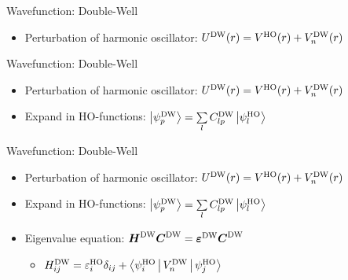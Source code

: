 \documentclass[10pt, t, xcolor=dvipsnames]{beamer}
\begin{document}
{{{{{\begin{frame}[fragile]{Wavefunction: Double-Well}
    \begin{itemize}
        \item Perturbation of harmonic oscillator: $U^{\text{DW}}(r) = V^{\text{HO}}(r) + V^{\text{DW}}_n(r)$
    \end{itemize}
\end{frame}

\begin{frame}[fragile]{Wavefunction: Double-Well}
    \begin{itemize}
        \item Perturbation of harmonic oscillator: $U^{\text{DW}}(r) = V^{\text{HO}}(r) + V^{\text{DW}}_n(r)$
        \item Expand in HO-functions: $\ket{\psi^{\text{DW}}_p} = \sum\limits_{l}C^{\text{DW}}_{lp}\ket{\psi^{\text{HO}}_l}$
    \end{itemize}
\end{frame}

\begin{frame}[fragile]{Wavefunction: Double-Well}
    \begin{itemize}
        \item Perturbation of harmonic oscillator: $U^{\text{DW}}(r) = V^{\text{HO}}(r) + V^{\text{DW}}_n(r)$
        \item Expand in HO-functions: $\ket{\psi^{\text{DW}}_p} = \sum\limits_{l}C^{\text{DW}}_{lp}\ket{\psi^{\text{HO}}_l}$
        \item Eigenvalue equation: $\bm{{H}}^{\text{DW}}\bm{{C}}^{\text{DW}} =
            \bm{{\varepsilon^{\text{DW}}}}\bm{{C}}^{\text{DW}}$
            \begin{itemize}
                \item $H^{\text{DW}}_{ij} = \varepsilon^{\text{HO}}_i\delta_{ij} +
                    \Braket{\psi^{\text{HO}}_i|V^{\text{DW}}_n|\psi^{\text{HO}}_j}$
            \end{itemize}
    \end{itemize}
\end{frame}

}}}}}
\end{document}
